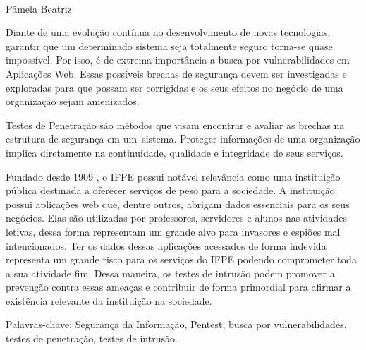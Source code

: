 \documentclass[
    12pt,               %
    openright,          %
    oneside,            %
    a4paper,            %
    section=TITLE,     %
    english,            %
    french,             %
    spanish,            %
    brazil              %
    ]{abntex2}
\newcommand{\citep}{\cite}
\begin{document}
\begin{dedicatoria}
\begin{flushright}
~
\end{flushright}



\begin{flushright}
Pâmela Beatriz
\end{flushright}

 \vspace*{\fill}
\end{dedicatoria}









\setlength{\absparsep}{18pt} %
\begin{resumo}
  
  
 Diante de uma evolução contínua no desenvolvimento de novas tecnologias, garantir que um determinado sistema seja totalmente seguro torna-se quase impossível. Por isso, é de extrema importância a busca por vulnerabilidades em Aplicações Web. Essas possíveis brechas de segurança devem ser investigadas e exploradas para que possam ser corrigidas e os seus efeitos no negócio de uma organização sejam amenizados.


Testes de Penetração são métodos que visam encontrar e avaliar as brechas na estrutura de segurança em um~sistema. Proteger informações de uma organização implica diretamente na continuidade, qualidade e integridade de seus serviços.


Fundado desde 1909 \citep{62952}, o IFPE possui notável relevância como uma instituição pública destinada a oferecer serviços de peso para a sociedade. A instituição possui aplicações web que, dentre outros, abrigam dados essenciais para os seus negócios. Elas são utilizadas por professores, servidores e alunos nas atividades letivas, dessa forma representam um grande alvo para invasores e espiões mal intencionados. Ter os dados dessas aplicações acessados de forma indevida representa um grande risco para os serviços do IFPE podendo comprometer toda a sua atividade fim. Dessa maneira, os testes de intrusão podem promover a prevenção contra essas ameaças e contribuir de forma primordial para afirmar a existência relevante da instituição na sociedade.




Palavras-chave: Segurança da Informação, Pentest, busca por vulnerabilidades, testes de penetração, testes de intrusão.


\end{resumo}
\end{document}
